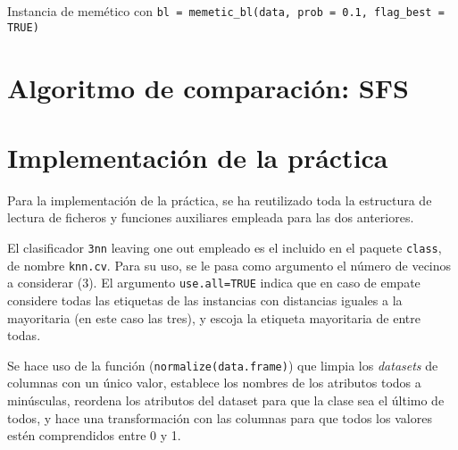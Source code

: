 \documentclass[a4paper,11pt]{article}
\begin{document}
Instancia de memético con \texttt{bl = memetic\_bl(data, prob = 0.1, flag\_best = TRUE)}


\section{Algoritmo de comparación: SFS}

\small{\texttt{}}
\normalsize


\section{Implementación de la práctica}
Para la implementación de la práctica, se ha reutilizado toda la estructura de lectura de ficheros y funciones auxiliares
empleada para las dos anteriores.

El clasificador \texttt{3nn} leaving one out empleado es el incluido en el paquete \texttt{class}, de nombre
\texttt{knn.cv}. Para su uso, se le pasa como argumento el número de vecinos a considerar (3). El argumento 
\texttt{use.all=TRUE} indica que en caso de empate considere todas las etiquetas de las instancias con distancias 
iguales a la mayoritaria (en este caso las tres), y escoja la etiqueta mayoritaria de entre todas. 

Se hace uso de la función (\texttt{normalize(data.frame)}) que limpia los \textit{datasets} de columnas con
un único valor, establece los nombres de los atributos todos a minúsculas, reordena los atributos del dataset para que
la clase sea el último de todos, y hace una transformación con las columnas para que todos los valores estén comprendidos
entre 0 y 1.
\end{document}
